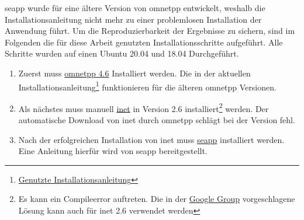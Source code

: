 \gls{seapp} wurde für eine ältere Version von \gls{omnetpp} entwickelt, weshalb die Installationsanleitung nicht mehr zu einer problemlosen Installation der Anwendung führt. Um die Reproduzierbarkeit der Ergebnisse zu sichern, sind im Folgenden die für diese Arbeit genutzten Installationsschritte aufgeführt. Alle Schritte wurden auf einen Ubuntu 20.04 und 18.04 Durchgeführt. 
\begin{enumerate}
	\item Zuerst muss \href{https://omnetpp.org/download/old}{\gls{omnetpp} 4.6} Installiert werden. Die in der aktuellen Installationsanleitung\footnote{\href{https://doc.omnetpp.org/omnetpp/InstallGuide.pdf}{Genutzte Installationsanleitung}} funktionieren für die älteren \gls{omnetpp} Versionen. 
	\item Als nächstes muss manuell \href{https://inet.omnetpp.org/Download.html}{\gls{inet}} in Version 2.6 installiert\footnote{Es kann ein Compileerror auftreten. Die in der \href{https://groups.google.com/forum/\#!topic/omnetpp/96orSuS3Whg}{Google Group} vorgeschlagene Lösung kann auch für \gls{inet} 2.6 verwendet werden} werden. Der automatische Download von \gls{inet} durch \gls{omnetpp} schlägt bei der Version fehl.
	\item Nach der erfolgreichen Installation von \gls{inet} muss \href{https://omnetpp.org/download-items/SEA++.html}{\gls{seapp}} installiert werden. Eine Anleitung hierfür wird von \gls{seapp}\cite{SEAManual} bereitgestellt.
\end{enumerate}